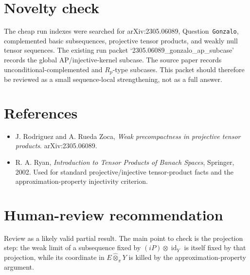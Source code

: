 \documentclass[11pt]{article}
\newcommand{\pten}{\widehat{\otimes}_{\pi}}
\begin{document}
\section*{Novelty check}

The cheap run indexes were searched for arXiv:2305.06089, Question~\texttt{Gonzalo}, complemented basic subsequences, projective tensor products, and weakly null tensor sequences.  The existing run packet `2305.06089\_gonzalo\_ap\_subcase' records the global AP/injective-kernel subcase.  The source paper records unconditional-complemented and \(R_p\)-type subcases.  This packet should therefore be reviewed as a small sequence-local strengthening, not as a full answer.

\section*{References}

\begin{itemize}
\item J. Rodriguez and A. Rueda Zoca, \emph{Weak precompactness in projective tensor products}.  arXiv:2305.06089.
\item R. A. Ryan, \emph{Introduction to Tensor Products of Banach Spaces}, Springer, 2002.  Used for standard projective/injective tensor-product facts and the approximation-property injectivity criterion.
\end{itemize}

\section*{Human-review recommendation}

Review as a likely valid partial result.  The main point to check is the projection step: the weak limit of a subsequence fixed by \((iP)\otimes\operatorname{id}_Y\) is itself fixed by that projection, while its coordinate in \(E\pten Y\) is killed by the approximation-property argument.
\end{document}

